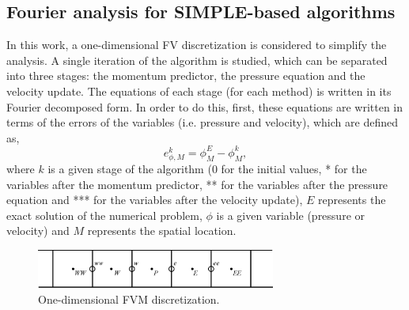 \documentclass[final,3p,times,11pt,onecolumn]{myElsarticle}
\numberwithin{equation}{section}
\begin{document}
\subsection{Fourier analysis for SIMPLE-based algorithms}

In this work, a one-dimensional FV discretization is considered to simplify the analysis. A single iteration of the algorithm is studied, which can be separated into three stages: the momentum predictor, the pressure equation and the velocity update. The equations of each stage (for each method) is written in its Fourier decomposed form. In order to do this, first, these equations are written in terms of the errors of the variables (i.e. pressure and velocity), which are defined as,
\begin{equation}
    e^k_{\phi,M} = \phi^{E}_{M}-\phi_M^{k},
\end{equation}
where $k$ is a given stage of the algorithm ($0$ for the initial values, * for the variables after the momentum predictor, ** for the variables after the pressure equation and *** for the variables after the velocity update), $E$ represents the exact solution of the numerical problem, $\phi$ is a given variable (pressure or velocity) and $M$ represents the spatial location.
\begin{figure}[b!]
    \centering
    \includegraphics[width=0.7\textwidth]{fig/cells2.eps}
    \caption{One-dimensional FVM discretization.}
    \label{fig:4a}
\end{figure}
\end{document}
